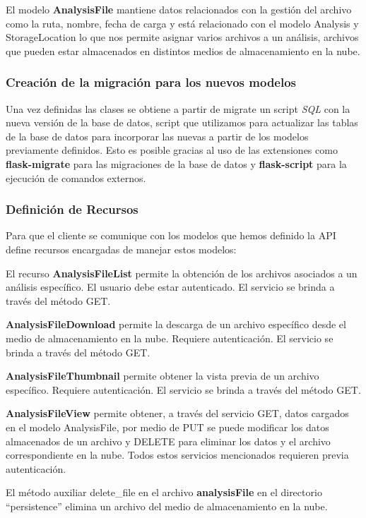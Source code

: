 El modelo \textbf{AnalysisFile} mantiene datos relacionados con la gestión del archivo como la ruta, nombre, fecha de carga y está relacionado con el modelo Analysis y StorageLocation lo que nos permite asignar varios archivos a un análisis, archivos que pueden estar almacenados en distintos medios de almacenamiento en la nube.

\subsubsection{Creación de la migración para los nuevos modelos}

Una vez definidas las clases se obtiene a partir de migrate un script\textit{ SQL} con la nueva versión de la base de datos, script que utilizamos para actualizar las tablas de la base de datos para incorporar las nuevas a partir de los modelos previamente definidos. Esto es posible gracias al uso de las extensiones como \textbf{flask-migrate} para las migraciones de la base de datos y \textbf{flask-script} para la ejecución de comandos externos.

\subsubsection{Definición de Recursos}

Para que el cliente se comunique con los modelos que hemos definido la API define recursos encargadas de manejar estos modelos:

El recurso \textbf{AnalysisFileList} permite la obtención de los archivos asociados a un análisis específico. El usuario debe estar autenticado. El servicio se brinda a través del método GET.

\textbf{AnalysisFileDownload} permite la descarga de un archivo específico desde el medio de almacenamiento en la nube. Requiere autenticación. El servicio se brinda a través del método GET.

\textbf{AnalysisFileThumbnail} permite obtener la vista previa de un archivo específico. Requiere autenticación. El servicio se brinda a través del método GET.

\textbf{AnalysisFileView} permite obtener, a través del servicio GET, datos cargados en el modelo AnalysisFile, por medio de PUT se  puede modificar los datos almacenados de un archivo y DELETE para eliminar los datos y el archivo correspondiente en la nube. Todos estos servicios mencionados requieren previa autenticación.

El método auxiliar delete\_file en el archivo \textbf{analysisFile} en el directorio ``persistence'' elimina un archivo del medio de almacenamiento en la nube.

